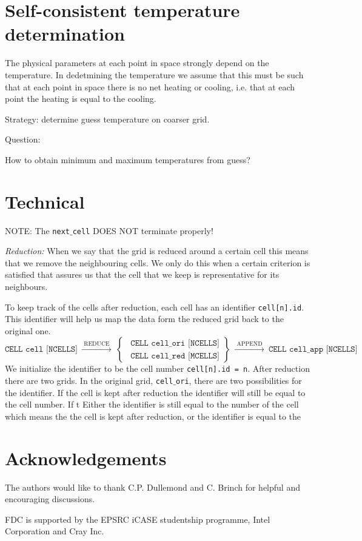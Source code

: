 \documentclass[]{article}
\begin{document}
\section{Self-consistent temperature determination}

The physical parameters at each point in space strongly depend on the temperature.
In dedetmining the temperature we assume that this must be such that at each point in space there is no net heating or cooling, i.e. that at each point the heating is equal to the cooling.

\bigskip

Strategy: determine guess temperature on coarser grid.

\bigskip

Question:

How to obtain minimum and maximum temperatures from guess?





\section{Technical}


NOTE: The \texttt{next$\_$cell} DOES NOT terminate properly!

\bigskip

\emph{Reduction:} When we say that the grid is reduced around a certain cell this means that we remove the neighbouring cells. We only do this when a certain criterion is satisfied that assures us that the cell that we keep is representative for its neighbours.

\bigskip

To keep track of the cells after reduction, each cell has an identifier \texttt{cell[n].id}. This identifier will help us map the data form the reduced grid back to the original one.
\begin{equation*}
  \texttt{CELL cell [NCELLS]}
  \ \xrightarrow{\text{ REDUCE }} \ \left.
  \begin{cases}
    \ \ \texttt{CELL cell$\_$ori [NCELLS]} \\
    \ \ \texttt{CELL cell$\_$red [MCELLS]}
  \end{cases}
  \right\} \ \xrightarrow{\text{ APPEND }} \
  \texttt{CELL cell$\_$app [NCELLS]}
\end{equation*}
We initialize the identifier to be the cell number \texttt{cell[n].id = n}. After reduction there are two grids. In the original grid, \texttt{cell$\_$ori}, there are two possibilities for the identifier. If the cell is kept after reduction the identifier will still be equal to the cell number. If t Either the identifier is still equal to the number of the cell which means the the cell is kept after reduction, or the identifier is equal to the


\section*{Acknowledgements}
The authors would like to thank C.P. Dullemond and C. Brinch for helpful and encouraging discussions.

FDC is supported by the EPSRC iCASE studentship programme, Intel Corporation and Cray Inc.





\end{document}

